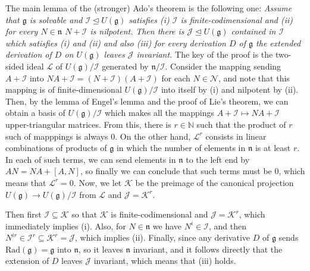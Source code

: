 \documentclass{article}
\newcommand{\NaN}{\mathbb{N}}
\newcommand{\lie}[1]{\mathfrak{#1}}
\newcommand{\Rad}[1]{\mathrm{Rad}(#1)}
\begin{document}
The main lemma of the (stronger) Ado's theorem is the following one: \textit{Assume that $\lie{g}$ is solvable and $\mathcal{I} \trianglelefteq U(\lie{g})$ satisfies (i) $\mathcal{I}$ is finite-codimensional and (ii) for every $N \in \lie{n}$ $N + \mathcal{I}$ is nilpotent.}
\textit{Then there is $\mathcal{J} \trianglelefteq U(\lie{g})$ contained in $\mathcal{I}$ which satisfies (i) and (ii) and also (iii) for every derivation $D$ of $\lie{g}$ the extended derivation of $D$ on $U(\lie{g})$ leaves $\mathcal{J}$ invariant.}
The key of the proof is the two-sided ideal $\mathcal{L}$ of $U(\lie{g}) / \mathcal{I}$ generated by $\lie{n} / \mathcal{I}$.
Consider the mapping sending $A + \mathcal{I}$ into $NA + \mathcal{I} = (N + \mathcal{I})(A + \mathcal{I})$ for each $N \in \mathcal{N}$, and note that this mapping is of finite-dimensional $U(\lie{g}) / \mathcal{I}$ into itself by (i) and nilpotent by (ii).
Then, by the lemma of Engel's lemma and the proof of Lie's theorem, we can obtain a basis of $U(\lie{g}) / \mathcal{I}$ which makes all the mappings $A + \mathcal{I} \mapsto NA + \mathcal{I}$ upper-triangular matrices.
From this, there is $r \in \NaN$ such that the product of $r$ such of mapppings is always 0.
On the other hand, $\mathcal{L}^r$ consists in linear combinations of products of $\lie{g}$ in which the number of elements in $\lie{n}$ is at least $r$.
In each of such terms, we can send elements in $\lie{n}$ to the left end by $AN = NA + [A, N]$, so finally we can conclude that such terms must be 0, which means that $\mathcal{L}^r = 0$.
Now, we let $\mathcal{K}$ be the preimage of the canonical projection $U(\lie{g}) \to U(\lie{g}) / \mathcal{I}$ from $\mathcal{L}$ and $\mathcal{J} = \mathcal{K}^r$.

Then first $\mathcal{I} \subseteq \mathcal{K}$ so that $\mathcal{K}$ is finite-codimensional and $\mathcal{J} = \mathcal{K}^r$, which immediately implies (i).
Also, for $N \in \lie{n}$ we have $N^i \in \mathcal{I}$, and then $N^{ir} \in \mathcal{I}^r \subseteq \mathcal{K}^r = \mathcal{J}$, which implies (ii).
Finally, since any derivative $D$ of $\lie{g}$ sends $\Rad{\lie{g}} = \lie{g}$ into $\lie{n}$, so it leaves $\lie{n}$ invariant, and it follows directly that the extension of $D$ leaves $\mathcal{J}$ invariant, which means that (iii) holds.
\end{document}
